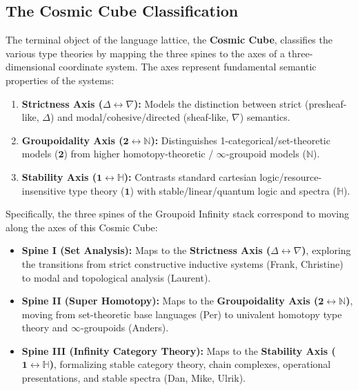 \documentclass{article}
\theoremstyle{definition}
\theoremstyle{plain}
\begin{document}
\newpage
\subsection{The Cosmic Cube Classification}
The terminal object of the language lattice, the \textbf{Cosmic Cube}, classifies the various type theories by mapping the three spines to the axes of a three-dimensional coordinate system. The axes represent fundamental semantic properties of the systems:
\begin{enumerate}
    \item \textbf{Strictness Axis ($\Delta \leftrightarrow \nabla$):} Models the distinction between strict (presheaf-like, $\Delta$) and modal/cohesive/directed (sheaf-like, $\nabla$) semantics.
    \item \textbf{Groupoidality Axis ($\mathbf{2} \leftrightarrow \mathbb{N}$):} Distinguishes 1-categorical/set-theoretic models ($\mathbf{2}$) from higher homotopy-theoretic / $\infty$-groupoid models ($\mathbb{N}$).
    \item \textbf{Stability Axis ($\mathbf{1} \leftrightarrow \mathbb{H}$):} Contrasts standard cartesian logic/resource-insensitive type theory ($\mathbf{1}$) with stable/linear/quantum logic and spectra ($\mathbb{H}$).
\end{enumerate}

Specifically, the three spines of the Groupoid Infinity stack correspond to moving along the axes of this Cosmic Cube:
\begin{itemize}
    \item \textbf{Spine I (Set Analysis):} Maps to the \textbf{Strictness Axis ($\Delta \leftrightarrow \nabla$)}, exploring the transitions from strict constructive inductive systems (Frank, Christine) to modal and topological analysis (Laurent).
    \item \textbf{Spine II (Super Homotopy):} Maps to the \textbf{Groupoidality Axis ($\mathbf{2} \leftrightarrow \mathbb{N}$)}, moving from set-theoretic base languages (Per) to univalent homotopy type theory and $\infty$-groupoids (Anders).
    \item \textbf{Spine III (Infinity Category Theory):} Maps to the \textbf{Stability Axis ($\mathbf{1} \leftrightarrow \mathbb{H}$)}, formalizing stable category theory, chain complexes, operational presentations, and stable spectra (Dan, Mike, Ulrik).
\end{itemize}
\end{document}

